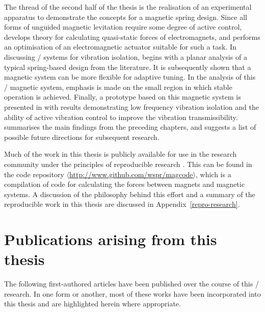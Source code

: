 \documentclass[11pt,a4paper]{memoir}
\begin{document}
The thread of the second half of the thesis is the realisation of an experimental apparatus to demonstrate the concepts for a magnetic spring design.
Since all forms of unguided magnetic levitation require some degree of active control,  develops theory for calculating quasi-static forces of electromagnets, and performs an optimisation of an electromagnetic actuator suitable for such a task.
In discussing \qzs/ systems for vibration isolation,  begins with a planar analysis of a  typical spring-based design from the literature.
It is subsequently shown that a magnetic system can be more flexible for adaptive tuning.
In the analysis of this \qzs/ magnetic system, emphasis is made on the small region in which stable operation is achieved.
Finally, a prototype based on this magnetic system is presented in  with results demonstrating low frequency vibration isolation and the ability of active vibration control to improve the vibration transmissibility.
 summarises the main findings from the preceding chapters, and suggests a list of possible future directions for subsequent research.

Much of the work in this thesis is publicly available for use in the research community under the principles of reproducible research \parencite{kovacevic2007-icassp}.
This can be found in the code repository $\langle$\url{http://www.github.com/wspr/magcode}$\rangle$, which is a compilation of code for calculating the forces between magnets and magnetic systems.
A discussion of the philosophy behind this effort and a summary of the reproducible work in this thesis are discussed in Appendix~\ref{repro-research}.

\section{Publications arising from this thesis}

The following first-authored articles have been published over the course of this \PhD/{} research.
In one form or another, most of these works have been incorporated into this thesis and are highlighted herein where appropriate.

\def\citejournal#1{
\item[\cite{#1}]
\emph{\citetitle{#1}};
\citefield{#1}{journaltitle}, \citeyear{#1}.
\medskip
}

\def\citeconf#1{
\item[\cite{#1}]
\emph{\citetitle{#1}};
\citefield{#1}{booktitle}, \citeyear{#1}.
\medskip
}
\end{document}
